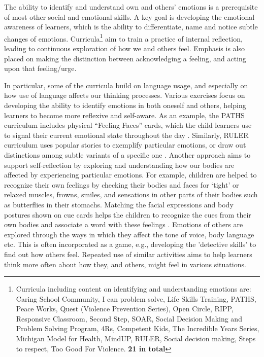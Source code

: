 \documentclass[prodmode,acmtochi]{acmsmall}
\newcommand{\GeraldineFIX}[1]{}
\begin{document}
The ability to identify and understand own and others' emotions is a prerequisite of most other social and emotional skills. A key goal is developing the emotional awareness of learners, which is the ability to differentiate, name and notice subtle changes of emotions. Curricula\footnote{Curricula including content on identifying and understanding emotions are: Caring School Community, I can problem solve, Life Skills Training, PATHS, Peace Works, Quest (Violence Prevention Series), Open Circle, RIPP, Responsive Classroom, Second Step, SOAR, Social Decision Making and Problem Solving Program, 4Rs, Competent Kids, The Incredible Years Series, Michigan Model for Health, MindUP, RULER, Social decision making, Steps to respect, Too Good For Violence. {\bf 21 in total}} aim to train a practice of internal reflection, leading to continuous exploration of how we and others feel. Emphasis is also placed on making the distinction between acknowledging a feeling, and acting upon that feeling/urge. 
\GeraldineFIX{G: all the other subsections list the relevant curricula at the beginning of the section so maybe move the footnote with the list from end of section to here}

In particular, some of the curricula build on language usage, and especially on how use of language affects our thinking processes. Various exercises focus on developing the ability to identify emotions in both oneself and others, helping learners to become more reflexive and self-aware. As an example, the PATHS curriculum  includes physical ``Feeling Faces'' cards, which the child learners use to signal their current emotional state throughout the day \cite{Kam2004,Domitrovich2007}. Similarly,  RULER curriculum uses popular stories to exemplify particular emotions, or draw out distinctions among subtle variants of a specific one \cite{Reyes2012}. 
%
Another approach aims to support self-reflection by exploring and understanding how our bodies are affected by experiencing particular emotions. For example, children are helped to recognize their own feelings by checking their bodies and faces for `tight' or relaxed muscles, frowns, smiles, and sensations in other parts of their bodies such as butterflies in their stomachs. Matching the facial expressions and body postures shown on cue cards helps the children to recognize the cues from their own bodies and associate a word with these feelings \cite{Webster-Stratton2004}. 
%               
Emotions of others are explored through the ways in which they affect the tone of voice, body language etc. This is often incorporated as a game, e.g., developing the 'detective skills' to find out how others feel. Repeated   use of similar activities aims to help learners think more often about how they, and others, might feel in various situations. 
\GeraldineFIX{G: do you really mean constant ie no break???}
\end{document}
